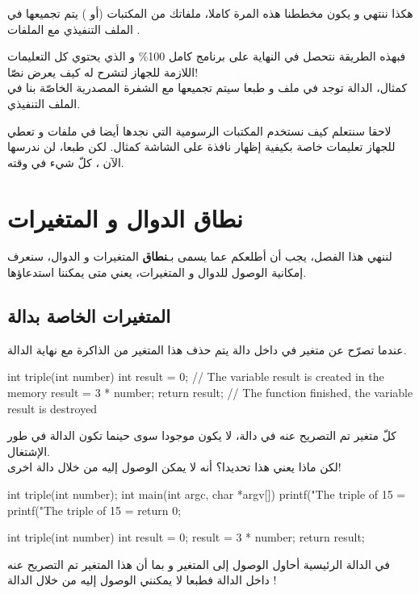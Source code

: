 هكذا ننتهي و يكون مخططنا هذه المرة كاملا، ملفاتك من المكتبات
(أو
)
يتم تجميعها في الملف التنفيذي مع الملفات
.

فبهذه الطريقة نتحصل في النهاية على برنامج كامل
100\%
و الذي يحتوي كل التعليمات اللازمة للجهاز لتشرح له كيف يعرض نصّا!\\
كمثال، الدالة
توجد في ملف
و طبعا سيتم تجميعها مع الشفرة المصدرية الخاصّة بنا في الملف التنفيذي.

لاحقا سنتعلم كيف نستخدم المكتبات الرسومية التي نجدها أيضا في ملفات
و تعطي للجهاز تعليمات خاصة بكيفية إظهار نافذة على الشاشة كمثال. لكن طبعا، لن ندرسها الآن ، كلّ شيء في وقته.

\section{نطاق الدوال و المتغيرات}

لننهي هذا الفصل، يجب أن أطلعكم عما يسمى بـ\textbf{نطاق}
المتغيرات و الدوال، سنعرف إمكانية الوصول للدوال و المتغيرات، يعني متى يمكننا استدعاؤها.

\subsection{المتغيرات الخاصة بدالة}

عندما تصرّح عن متغير في داخل دالة يتم حذف هذا المتغير من الذاكرة مع نهاية الدالة.

\begin{Csource}
int triple(int number)
{
	int result = 0; // The variable result is created in the memory
	result = 3 * number;
	return result;
} // The function finished, the variable result is destroyed
\end{Csource}

كلّ متغير تم التصريح عنه في دالة، لا يكون موجودا سوى حينما تكون الدالة في طور الإشتغال.\\
لكن ماذا يعني هذا تحديدا؟ أنه لا يمكن الوصول إليه من خلال  دالة اخرى!

\begin{Csource}
int triple(int number);
int main(int argc, char *argv[])
{
	printf("The triple of 15 = %
	printf("The triple of 15 = %
	return 0;
}

int triple(int number)
{
	int result = 0;
	result = 3 * number;
	return result;
}
\end{Csource}

في الدالة الرئيسية أحاول الوصول إلى المتغير
و بما أن هذا المتغير تم التصريح عنه داخل الدالة
فطبعا لا يمكنني الوصول إليه من خلال الدالة
!

